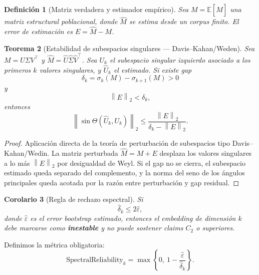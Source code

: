 \documentclass[11pt,a4paper]{article}
\newtheorem{theorem}{Teorema}[section]
\newtheorem{corollary}[theorem]{Corolario}
\newtheorem{definition}[theorem]{Definición}
\newcommand{\E}{\mathbb{E}}
\newcommand{\1}{\mathbf{1}}
\newcommand{\norm}[1]{\left\lVert #1 \right\rVert}
\numberwithin{equation}{section}
\begin{document}
\begin{definition}[Matriz verdadera y estimador empírico]
Sea $M=\E[\widehat M]$ una matriz estructural poblacional, donde $\widehat M$ se estima desde un corpus finito. El error de estimación es $E=\widehat M-M$.
\end{definition}

\begin{theorem}[Estabilidad de subespacios singulares --- Davis--Kahan/Weden]
\label{thm:spectral_stability}
Sea $M=U\Sigma V^\top$ y $\widehat M=\widehat U\widehat\Sigma\widehat V^\top$. Sea $U_k$ el subespacio singular izquierdo asociado a los primeros $k$ valores singulares, y $\widehat U_k$ el estimado. Si existe gap
\begin{equation}
    \delta_k=\sigma_k(M)-\sigma_{k+1}(M)>0
\end{equation}
y
\begin{equation}
    \norm{E}_2<\delta_k,
\end{equation}
entonces
\begin{equation}
    \norm{\sin\Theta(\widehat U_k,U_k)}_2
    \leq
    \frac{\norm{E}_2}{\delta_k-\norm{E}_2}.
\end{equation}
\end{theorem}

\begin{proof}
Aplicación directa de la teoría de perturbación de subespacios tipo Davis--Kahan/Wedin. La matriz perturbada $\widehat M=M+E$ desplaza los valores singulares a lo más $\norm{E}_2$ por desigualdad de Weyl. Si el gap no se cierra, el subespacio estimado queda separado del complemento, y la norma del seno de los ángulos principales queda acotada por la razón entre perturbación y gap residual.
\end{proof}

\begin{corollary}[Regla de rechazo espectral]
\label{cor:spectral_rejection}
Si
\begin{equation}
    \widehat\delta_k\leq 2\widehat\varepsilon,
\end{equation}
donde $\widehat\varepsilon$ es el error bootstrap estimado, entonces el embedding de dimensión $k$ debe marcarse como \textbf{inestable} y no puede sostener claims $C_2$ o superiores.
\end{corollary}

Definimos la métrica obligatoria:
\begin{equation}
    \mathrm{SpectralReliability}_k
    =
    \max\left\{0,\ 1-\frac{\widehat\varepsilon}{\widehat\delta_k}\right\}.
\end{equation}
\end{document}
